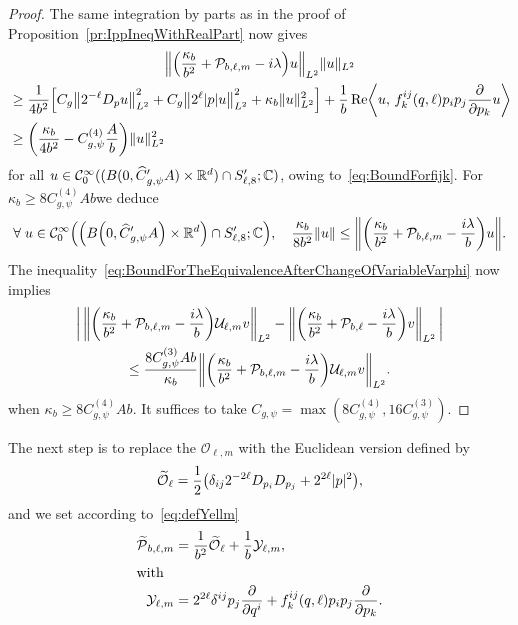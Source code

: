 \documentclass[AHL,Unicode,longabstracts]{cedram}
\newcommand{\C}{\mathbb{C}}
\newcommand{\R}{\mathbb{R}}
\newcommand{\clC}{\mathcal{C}}
\newcommand{\clY}{\mathcal{Y}}
\newcommand{\clO}{\mathcal{O}}
\newcommand{\clP}{\mathcal{P}}
\newcommand{\clU}{\mathcal{U}}
\DeclareMathOperator{\Ree}{Re}
\let\oldtilde\tilde
\renewcommand*{\tilde}[1]{\mathchoice{\widetilde{#1}}{\widetilde{#1}}{\oldtilde{#1}}{\oldtilde{#1}}}
\let\oldhat\hat
\renewcommand*{\hat}[1]{\mathchoice{\widehat{#1}}{\widehat{#1}}{\oldhat{#1}}{\oldhat{#1}}}
\let\oldforall\forall
\renewcommand*{\forall}{\mathrel{\oldforall}}
\let\originalleft\left
\let\originalright\right
\renewcommand{\left}{\mathopen{}\mathclose\bgroup\originalleft}
\renewcommand{\right}{\aftergroup\egroup\originalright}
\newcounter{setofstep}
\newcounter{step}[setofstep]
\begin{document}
\begin{proof}
The same integration by parts as in the proof of Proposition~\ref{pr:IppIneqWithRealPart} now gives
\begin{multline*}
\left\| \left(\frac{\kappa_{b}}{b^{2}}+\clP_{b,\ell,m} - i\lambda\right) u \right\|_{L^{2}} \|u\|_{L^{2}}\\
\begin{aligned}
&\geq \frac{1}{4b^{2}}
\left[C_g\left\|2^{-\ell}D_{p}u\right\|_{L^{2}}^{2} + C_g\left\| 2^\ell|p|u\right\|_{L^{2}}^{2} + \kappa_{b} \|u\|_{L^{2}}^2
\right]+\frac{1}{b}\Ree\left\langle u,\, f_{k}^{ij}(q,\ell)p_{i}p_{j}\frac{\partial}{\partial p_{k}} u\right\rangle\\
&\geq \left(\frac{\kappa_{b}}{4b^2}
-C_{g,\psi}^{(4)} \frac{A}{b}\right)\|u\|_{L^{2}}^2
\end{aligned}
\end{multline*}
for all $u\in \clC^{\infty}_0((B(0,\hat{C}'_{g,\psi} A)\times\R^d)\cap S'_{\ell,8};\C)$, owing to~\eqref{eq:BoundForfijk}. For $\kappa_b\geq 8C_{g,\psi}^{(4)}Ab$\linebreak we deduce
\[
\forall u\in \clC^{\infty}_0\left(\left(B\left(0,\hat{C}'_{g,\psi} A\right)\times\R^d\right)\cap S'_{\ell,8};\C\right),\quad \frac{\kappa_{b}}{8b^{2}}\|u\| \leq \left\| \left(\frac{\kappa_{b}}{b^{2}}+\clP_{b,\ell,m}-\frac{i\lambda}{b}\right)u\right\|.
\]
The inequality~\eqref{eq:BoundForTheEquivalenceAfterChangeOfVariableVarphi} now implies
\begin{multline}
\left|\,\left\| \left(\frac{\kappa_{b}}{b^{2}}+\clP_{b,\ell,m} - \frac{i\lambda}{b}\right)\clU_{\ell,m}v \right\|_{L^2} - \left\| \left(\frac{\kappa_{b}}{b^{2}} + \clP_{b,\ell} - \frac{i\lambda}{b}\right)v \right\|_{L^2}\,\right| \\
\leq \frac{8C_{g,\psi}^{(3)}Ab}{\kappa_{b}} \left\| \left(\frac{\kappa_{b}}{b^{2}} + \clP_{b,\ell,m} - \frac{i\lambda}{b}\right)\clU_{\ell,m}v \right\|_{L^2}.
\end{multline}
when $\kappa_b\geq 8C_{g,\psi}^{(4)}Ab$. It suffices to take $C_{g,\psi}=\max(8C_{g,\psi}^{(4)}, 16C_{g,\psi}^{(3)})$.
\end{proof}

The next step is to replace the $\clO_{\ell,m}$ with the Euclidean version defined by
\begin{equation}
\tilde{\clO}_{\ell}=\frac{1}{2}
\left (\delta_{ij}2^{-2\ell}D_{p_{i}}D_{p_{j}}+2^{2\ell}|p|^2\right),
\end{equation}
\pagebreak{}
\noindent and we set according to~\eqref{eq:defYellm}
\begin{align}
\tilde{\clP}_{b,\ell,m} &= \frac{1}{b^{2}} \tilde{\clO}_{\ell} + \frac{1}{b}\clY_{\ell,m} ,\label{eq:deftildePbellm}
\\
\intertext{with}
\clY_{\ell,m}&=2^{2\ell}\delta^{ij}p_{j}\frac{\partial}{\partial q^{i}} + f_{k}^{ij}(q,\ell)p_{i}p_{j}\frac{\partial}{\partial p_{k}}.\label{eq:rappYellm}
\end{align}
\end{document}
